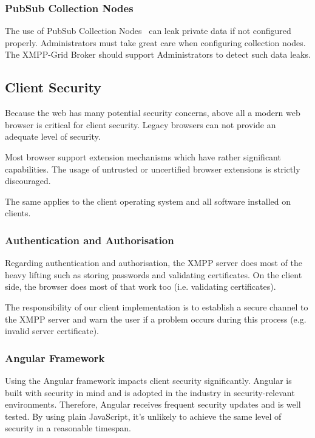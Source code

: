 \subsubsection{PubSub Collection Nodes}

The use of PubSub Collection Nodes~\cite{xep-0248} can leak private data if not configured properly.
Administrators must take great care when configuring collection nodes.
The XMPP-Grid Broker should support Administrators to detect such data leaks.

\subsection{Client Security}

Because the web has many potential security concerns, above all a modern web browser is critical for client security.
Legacy browsers can not provide an adequate level of security.~\cite{firefox-update-security}

Most browser support extension mechanisms which have rather significant capabilities.
The usage of untrusted or uncertified browser extensions is strictly discouraged.~\cite{browser-extension-security}

The same applies to the client operating system and all software installed on clients.

\subsubsection{Authentication and Authorisation}

Regarding authentication and authorisation, the XMPP server does most of the heavy lifting such as storing passwords and validating certificates.
On the client side, the browser does most of that work too (i.e. validating certificates).

The responsibility of our client implementation is to establish a secure channel to the XMPP server and warn the user if a problem occurs during this process (e.g. invalid server certificate).

\subsubsection{Angular Framework}

Using the Angular framework impacts client security significantly.
Angular is built with security in mind and is adopted in the industry in security-relevant environments.
Therefore, Angular receives frequent security updates and is well tested.
By using plain JavaScript, it's unlikely to achieve the same level of security in a reasonable timespan.

